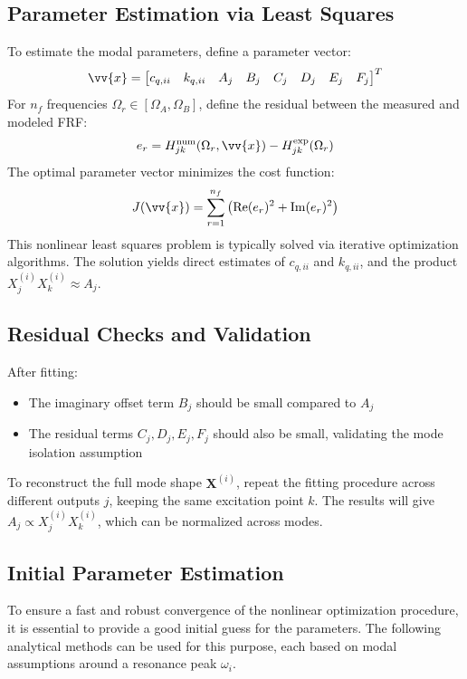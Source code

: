 \subsection{Parameter Estimation via Least Squares}

To estimate the modal parameters, define a parameter vector:
\[
\vv{x} = \begin{bmatrix}
c_{q,ii} & k_{q,ii} & A_{j} & B_{j} & C_{j} & D_{j} & E_{j} & F_{j}
\end{bmatrix}^T
\]
For \( n_f \) frequencies \( \Omega_r \in [\Omega_A, \Omega_B] \), define the residual between the measured and modeled FRF:
\[
e_r = H_{jk}^{\text{num}}(\Omega_r, \vv{x}) - H_{jk}^{\text{exp}}(\Omega_r)
\]
The optimal parameter vector minimizes the cost function:
\[
J(\vv{x}) = \sum_{r=1}^{n_f} \left( \operatorname{Re}(e_r)^2 + \operatorname{Im}(e_r)^2 \right)
\]
This nonlinear least squares problem is typically solved via iterative optimization algorithms. The solution yields direct estimates of \( c_{q,ii} \) and \( k_{q,ii} \), and the product \( X_j^{(i)} X_k^{(i)} \approx A_{j} \).

\subsection{Residual Checks and Validation}

After fitting:
\begin{itemize}
    \item The imaginary offset term \( B_{j} \) should be small compared to \( A_{j} \)
    \item The residual terms \( C_{j}, D_{j}, E_{j}, F_{j} \) should also be small, validating the mode isolation assumption
\end{itemize}

To reconstruct the full mode shape \( \boldsymbol{X}^{(i)} \), repeat the fitting procedure across different outputs \( j \), keeping the same excitation point \( k \). The results will give \( A_{j} \propto X_j^{(i)} X_k^{(i)} \), which can be normalized across modes.

\subsection{Initial Parameter Estimation}

To ensure a fast and robust convergence of the nonlinear optimization procedure, it is essential to provide a good initial guess for the parameters. The following analytical methods can be used for this purpose, each based on modal assumptions around a resonance peak \( \omega_i \). 

